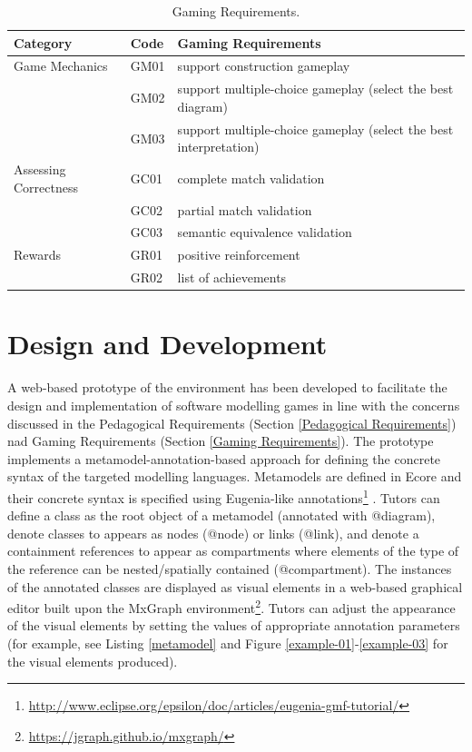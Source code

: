\documentclass[12pt, a4paper]{report} \usepackage[titletoc]{appendix}
\begin{document}
\begin{table}[t!]
\caption{Gaming Requirements.}
\label{gaming-requirements}
\begin{center}
\begin{tabular}{ p{2cm}p{1cm}p{10cm} } 
\hline
Category & Code & Gaming Requirements\\
\hline
\multirow{1}{2cm}{Game Mechanics}
& GM01 & support construction gameplay \cite{arnab2015mapping}\\
& GM02 & support multiple-choice gameplay (select the best diagram)\\
& GM03 & support multiple-choice gameplay (select the best interpretation)\\
\hline
\multirow{1}{2cm}{Assessing Correctness}
& GC01 & complete match validation\\
& GC02 & partial match validation\\
& GC03 & semantic equivalence validation\\
\hline
\multirow{1}{2cm}{Rewards}
& GR01 & positive reinforcement \cite{richter2015studying}\\
& GR02 & list of achievements \cite{richter2015studying}\\
\hline
\end{tabular}
\end{center}
\end{table}

\section{Design and Development}
A web-based prototype of the environment has been developed to facilitate the design and implementation of software modelling games in line with the concerns discussed in the Pedagogical Requirements (Section \ref{Pedagogical Requirements}) nad Gaming Requirements (Section \ref{Gaming Requirements}). The prototype implements a metamodel-annotation-based approach for defining the concrete syntax of the targeted modelling languages. Metamodels are defined in Ecore \cite{steinberg2008emf} and their concrete syntax is specified using Eugenia-like annotations\footnote{\url{http://www.eclipse.org/epsilon/doc/articles/eugenia-gmf-tutorial/}} \cite{kolovos2015eugenia}. Tutors can define a class as the root object of a metamodel (annotated with {\selectfont @diagram}), denote classes to appears as nodes ({\selectfont @node}) or links ({\selectfont @link}), and denote a containment references to appear as compartments where elements of the type of the reference can be nested/spatially contained ({\selectfont @compartment}). The instances of the annotated classes are displayed as visual elements in a web-based graphical editor built upon the MxGraph environment\footnote{\url{https://jgraph.github.io/mxgraph/}}. Tutors can adjust the appearance of the visual elements by setting the values of appropriate annotation parameters (for example, see Listing \ref{metamodel} and Figure \ref{example-01}-\ref{example-03} for the visual elements produced).
\end{document}
